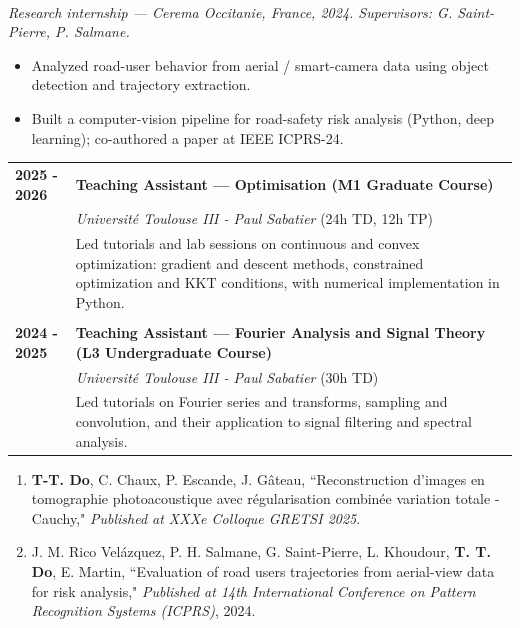 \documentclass[a4paper,10pt]{article}
\begin{document}
\medskip
{} \\
\emph{Research internship --- Cerema Occitanie, France, 2024. Supervisors: G. Saint-Pierre, P. Salmane.}
\begin{itemize}[leftmargin=*, noitemsep, topsep=2pt]
    \item Analyzed road-user behavior from aerial / smart-camera data using object detection and trajectory extraction.
    \item Built a computer-vision pipeline for road-safety risk analysis (Python, deep learning); co-authored a paper at IEEE ICPRS-24.
\end{itemize}

\begin{tabular}{p{3cm}p{13cm}}
    {\bf 2025 - 2026} & {\bf Teaching Assistant --- Optimisation (M1 Graduate Course)} \\
    & \emph{Université Toulouse III - Paul Sabatier} (24h TD, 12h TP) \\
    & Led tutorials and lab sessions on continuous and convex optimization: gradient and descent methods, constrained optimization and KKT conditions, with numerical implementation in Python. \\
    \vspace{0.15cm}\\
    {\bf 2024 - 2025} & {\bf Teaching Assistant --- Fourier Analysis and Signal Theory (L3 Undergraduate Course)} \\
    & \emph{Université Toulouse III - Paul Sabatier} (30h TD) \\
    & Led tutorials on Fourier series and transforms, sampling and convolution, and their application to signal filtering and spectral analysis.
\end{tabular}


\bigskip
\begin{enumerate}[leftmargin=*, label=\arabic*.]
    \item \textbf{T-T. Do}, C. Chaux, P. Escande, J. Gâteau, ``Reconstruction d’images en tomographie photoacoustique avec régularisation combinée variation totale - Cauchy," \emph{Published at XXXe Colloque GRETSI 2025}.

    \item J. M. Rico Velázquez, P. H. Salmane, G. Saint-Pierre, L. Khoudour, \textbf{T. T. Do}, E. Martin, ``Evaluation of road users trajectories from aerial-view data for risk analysis," \emph{Published at 14th International Conference on Pattern Recognition Systems (ICPRS)}, 2024.
\end{enumerate}
\end{document}
